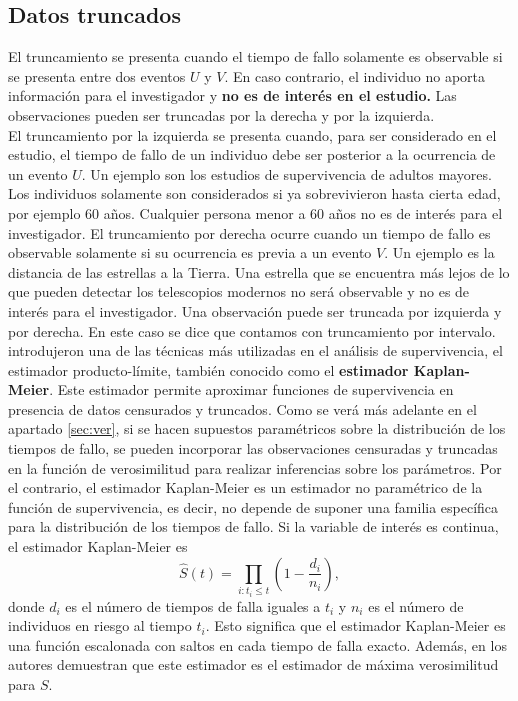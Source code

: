 \documentclass[11pt,a4paper]{article}
\begin{document}
\subsection{Datos truncados}
\label{sec:truncados}

El truncamiento se presenta cuando el tiempo de fallo solamente es observable si se presenta entre dos eventos $U$ y $V$. En caso contrario, el individuo no aporta información para el investigador y \textbf{no es de interés en el estudio.} Las observaciones pueden ser truncadas por la derecha y por la izquierda.\\

El truncamiento por la izquierda se presenta cuando, para ser considerado en el estudio, el tiempo de fallo de un individuo debe ser posterior  a la ocurrencia de un evento $U$. Un ejemplo son los estudios de supervivencia de adultos mayores. Los individuos solamente son considerados si ya sobrevivieron hasta cierta edad, por ejemplo 60 años. Cualquier persona menor a 60 años no es de interés para el investigador. El truncamiento por derecha ocurre cuando un tiempo de fallo es observable solamente si su ocurrencia es previa a un evento $V$. Un ejemplo es la distancia de las estrellas a la Tierra. Una estrella que se encuentra más lejos de lo que pueden detectar los telescopios modernos no será observable y no es de interés para el investigador. Una observación puede ser truncada por izquierda y por derecha. En este caso se dice que contamos con truncamiento por intervalo.\\

\citet{kaplan-meier} introdujeron una de las técnicas más utilizadas en el análisis de supervivencia, el estimador producto-límite, también conocido como el \textbf{estimador Kaplan-Meier}. Este estimador permite aproximar funciones de supervivencia en presencia de datos censurados y truncados. Como se verá más adelante en el apartado \ref{sec:ver}, si se hacen supuestos paramétricos sobre la distribución de los tiempos de fallo, se pueden incorporar las observaciones censuradas y truncadas en la función de verosimilitud para realizar inferencias sobre los parámetros. Por el contrario, el estimador Kaplan-Meier es un estimador no paramétrico de la función de supervivencia, es decir, no depende de suponer una familia específica para la distribución de los tiempos de fallo. Si la variable de interés es continua, el estimador Kaplan-Meier es
\begin{equation}
\label{eq:km}
\hat{S}(t) = \prod_{i: t_i \leq t} \left( 1-\frac{d_i}{n_i}\right),
\end{equation}
donde $d_i$ es el número de tiempos de falla iguales a $t_i$ y $n_i$ es el número de individuos en riesgo al tiempo $t_i$. Esto significa que el estimador Kaplan-Meier es una función escalonada con saltos en cada tiempo de falla exacto. Además, en \cite{kaplan-meier} los autores demuestran que este estimador es el estimador de máxima verosimilitud para $S$.\\
\end{document}
